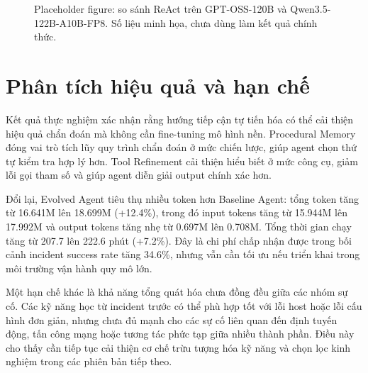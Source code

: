 \begin{figure}[htbp]
\centering
{}
\caption{Placeholder figure: so sánh ReAct trên GPT-OSS-120B và Qwen3.5-122B-A10B-FP8. Số liệu minh họa, chưa dùng làm kết quả chính thức.}
\label{fig:model_comparison_placeholder}
\end{figure}

\section{Phân tích hiệu quả và hạn chế}
\label{sec:discussion}

Kết quả thực nghiệm xác nhận rằng hướng tiếp cận tự tiến hóa có thể cải thiện hiệu quả chẩn đoán mà không cần fine-tuning mô hình nền. Procedural Memory đóng vai trò tích lũy quy trình chẩn đoán ở mức chiến lược, giúp agent chọn thứ tự kiểm tra hợp lý hơn. Tool Refinement cải thiện hiểu biết ở mức công cụ, giảm lỗi gọi tham số và giúp agent diễn giải output chính xác hơn.

Đổi lại, Evolved Agent tiêu thụ nhiều token hơn Baseline Agent: tổng token tăng từ 16.641M lên 18.699M (+12.4\%), trong đó input tokens tăng từ 15.944M lên 17.992M và output tokens tăng nhẹ từ 0.697M lên 0.708M. Tổng thời gian chạy tăng từ 207.7 lên 222.6 phút (+7.2\%). Đây là chi phí chấp nhận được trong bối cảnh incident success rate tăng 34.6\%, nhưng vẫn cần tối ưu nếu triển khai trong môi trường vận hành quy mô lớn.

Một hạn chế khác là khả năng tổng quát hóa chưa đồng đều giữa các nhóm sự cố. Các kỹ năng học từ incident trước có thể phù hợp tốt với lỗi host hoặc lỗi cấu hình đơn giản, nhưng chưa đủ mạnh cho các sự cố liên quan đến định tuyến động, tấn công mạng hoặc tương tác phức tạp giữa nhiều thành phần. Điều này cho thấy cần tiếp tục cải thiện cơ chế trừu tượng hóa kỹ năng và chọn lọc kinh nghiệm trong các phiên bản tiếp theo.
